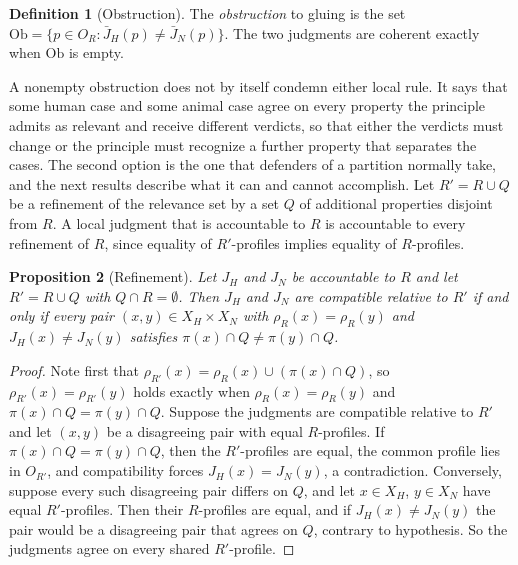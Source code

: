 \documentclass[11pt]{article}
\theoremstyle{definition}
\newtheorem{definition}{Definition}[section]
\theoremstyle{plain}
\newtheorem{proposition}[definition]{Proposition}
\theoremstyle{definition}
\newcommand{\Judg}{J}
\newcommand{\prof}{\rho}
\newcommand{\Rel}{R}
\begin{document}
\begin{definition}[Obstruction]
The \emph{obstruction} to gluing is the set $\mathrm{Ob}=\{p\in O_{\Rel}:\bar\Judg_H(p)\neq\bar\Judg_N(p)\}$. The two judgments are coherent exactly when $\mathrm{Ob}$ is empty.
\end{definition}

A nonempty obstruction does not by itself condemn either local rule. It says that some human case and some animal case agree on every property the principle admits as relevant and receive different verdicts, so that either the verdicts must change or the principle must recognize a further property that separates the cases. The second option is the one that defenders of a partition normally take, and the next results describe what it can and cannot accomplish. Let $\Rel'=\Rel\cup Q$ be a refinement of the relevance set by a set $Q$ of additional properties disjoint from $\Rel$. A local judgment that is accountable to $\Rel$ is accountable to every refinement of $\Rel$, since equality of $\Rel'$-profiles implies equality of $\Rel$-profiles.

\begin{proposition}[Refinement]\label{prop:refinement}
Let $\Judg_H$ and $\Judg_N$ be accountable to $\Rel$ and let $\Rel'=\Rel\cup Q$ with $Q\cap\Rel=\emptyset$. Then $\Judg_H$ and $\Judg_N$ are compatible relative to $\Rel'$ if and only if every pair $(x,y)\in X_H\times X_N$ with $\prof_{\Rel}(x)=\prof_{\Rel}(y)$ and $\Judg_H(x)\neq\Judg_N(y)$ satisfies $\pi(x)\cap Q\neq\pi(y)\cap Q$.
\end{proposition}

\begin{proof}
Note first that $\prof_{\Rel'}(x)=\prof_{\Rel}(x)\cup(\pi(x)\cap Q)$, so $\prof_{\Rel'}(x)=\prof_{\Rel'}(y)$ holds exactly when $\prof_{\Rel}(x)=\prof_{\Rel}(y)$ and $\pi(x)\cap Q=\pi(y)\cap Q$. Suppose the judgments are compatible relative to $\Rel'$ and let $(x,y)$ be a disagreeing pair with equal $\Rel$-profiles. If $\pi(x)\cap Q=\pi(y)\cap Q$, then the $\Rel'$-profiles are equal, the common profile lies in $O_{\Rel'}$, and compatibility forces $\Judg_H(x)=\Judg_N(y)$, a contradiction. Conversely, suppose every such disagreeing pair differs on $Q$, and let $x\in X_H$, $y\in X_N$ have equal $\Rel'$-profiles. Then their $\Rel$-profiles are equal, and if $\Judg_H(x)\neq\Judg_N(y)$ the pair would be a disagreeing pair that agrees on $Q$, contrary to hypothesis. So the judgments agree on every shared $\Rel'$-profile.
\end{proof}
\end{document}
